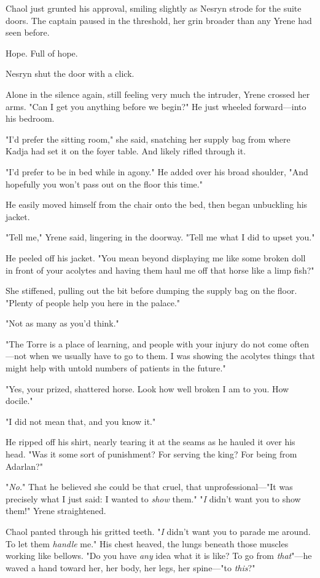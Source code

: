 Chaol just grunted his approval, smiling slightly as Nesryn strode for the suite doors. The captain paused in the threshold, her grin broader than any Yrene had seen before.

Hope. Full of hope.

Nesryn shut the door with a click.

Alone in the silence again, still feeling very much the intruder, Yrene crossed her arms. "Can I get you anything before we begin?" He just wheeled forward---into his bedroom.

"I'd prefer the sitting room," she said, snatching her supply bag from where Kadja had set it on the foyer table. And likely rifled through it.

"I'd prefer to be in bed while in agony." He added over his broad shoulder, "And hopefully you won't pass out on the floor this time."

He easily moved himself from the chair onto the bed, then began unbuckling his jacket.

"Tell me," Yrene said, lingering in the doorway. "Tell me what I did to upset you."

He peeled off his jacket. "You mean beyond displaying me like some broken doll in front of your acolytes and having them haul me off that horse like a limp fish?"

She stiffened, pulling out the bit before dumping the supply bag on the floor. "Plenty of people help you here in the palace."

"Not as many as you'd think."

"The Torre is a place of learning, and people with your injury do not come often---not when we usually have to go to them. I was showing the acolytes things that might help with untold numbers of patients in the future."

"Yes, your prized, shattered horse. Look how well broken I am to you. How docile."

"I did not mean that, and you know it."

He ripped off his shirt, nearly tearing it at the seams as he hauled it over his head. "Was it some sort of punishment? For serving the king? For being from Adarlan?"

"\emph{No.}" That he believed she could be that cruel, that unprofessional---"It was precisely what I just said: I wanted to
\emph{show} them." "\emph{I} didn't want you to show them!" Yrene straightened.

Chaol panted through his gritted teeth. "\emph{I} didn't want you to parade me around. To let them \emph{handle} me." His chest heaved, the lungs beneath those muscles working like bellows. "Do you have
\emph{any} idea what it is like? To go from \emph{that}"---he waved a hand toward her, her body, her legs, her spine---"to \emph{this}?"

